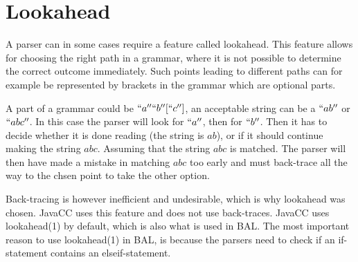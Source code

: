 \section{Lookahead} \label{sec:lookahead}
A parser can in some cases require a feature called lookahead. This feature allows for choosing the right path in a grammar, where it is not possible to determine the correct outcome immediately. Such points leading to different paths can for example be represented by brackets in the grammar which are optional parts. 

A part of a grammar could be $``a'' ``b'' [``c'']$, an acceptable string can be a $``ab''$ or $``abc''$. In this case the parser will look for $``a''$, then for $``b''$. Then it has to decide whether it is done reading (the string is $ab$), or if it should continue making the string $abc$. Assuming that the string $abc$ is matched. The parser will then have made a mistake in matching $abc$ too early and must back-trace all the way to the chsen point to take the other option. 

Back-tracing is however inefficient and undesirable, which is why lookahead was chosen. JavaCC uses this feature and does not use back-traces. JavaCC uses lookahead(1) by default, which is also what is used in BAL. The most important reason to use lookahead(1) in BAL, is because the parsers need to check if an if-statement contains an elseif-statement. 
